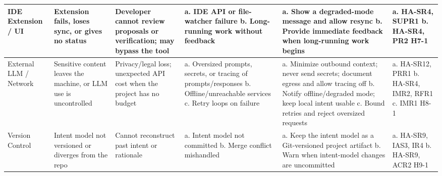 \documentclass{article}
\begin{document}
\begin{landscape}
\begin{small}
\begin{longtable}{|p{2.1cm}|p{2.4cm}|p{2.8cm}|p{3.2cm}|p{3.6cm}|p{2.4cm}|}
IDE Extension / UI &
Extension fails, loses sync, or gives no status &
Developer cannot review proposals or verification; may bypass the tool &
a. IDE API or file-watcher failure\newline
b. Long-running work without feedback &
a. Show a degraded-mode message and allow resync\newline
b. Provide immediate feedback when long-running work begins &
a. HA-SR4, SUPR1\newline
b. HA-SR4, PR2\newline
H7-1 \\
\hline

External LLM / Network &
Sensitive content leaves the machine, or LLM use is uncontrolled &
Privacy/legal loss; unexpected API cost when the project has no budget &
a. Oversized prompts, secrets, or tracing of prompts/responses\newline
b. Offline/unreachable services\newline
c. Retry loops on failure &
a. Minimize outbound context; never send secrets; document egress and allow
tracing off\newline
b. Notify offline/degraded mode; keep local intent usable\newline
c. Bound retries and reject oversized requests &
a. HA-SR12, PRR1\newline
b. HA-SR4, IMR2, RFR1\newline
c. IMR1\newline
H8-1 \\
\hline

Version Control &
Intent model not versioned or diverges from the repo &
Cannot reconstruct past intent or rationale &
a. Intent model not committed\newline
b. Merge conflict mishandled &
a. Keep the intent model as a Git-versioned project artifact\newline
b. Warn when intent-model changes are uncommitted &
a. HA-SR9, IAS3, IR4\newline
b. HA-SR9, ACR2\newline
H9-1 \\
\hline


\end{longtable}
\end{small}
\end{landscape}
\end{document}
